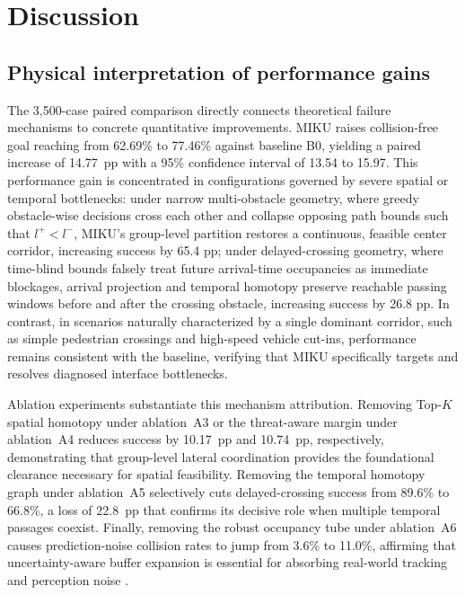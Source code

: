 \section{Discussion}
\label{sec:discussion}

\subsection{Physical interpretation of performance gains}

The 3,500-case paired comparison directly connects theoretical failure mechanisms to concrete quantitative improvements. MIKU raises collision-free goal reaching from 62.69\% to 77.46\% against baseline B0, yielding a paired increase of 14.77~pp with a 95\% confidence interval of 13.54 to 15.97. This performance gain is concentrated in configurations governed by severe spatial or temporal bottlenecks:
under narrow multi-obstacle geometry, where greedy obstacle-wise decisions cross each other and collapse opposing path bounds such that $l^+ < l^-$, MIKU's group-level partition restores a continuous, feasible center corridor, increasing success by 65.4 pp;
under delayed-crossing geometry, where time-blind bounds falsely treat future arrival-time occupancies as immediate blockages, arrival projection and temporal homotopy preserve reachable passing windows before and after the crossing obstacle, increasing success by 26.8 pp.
In contrast, in scenarios naturally characterized by a single dominant corridor, such as simple pedestrian crossings and high-speed vehicle cut-ins, performance remains consistent with the baseline, verifying that MIKU specifically targets and resolves diagnosed interface bottlenecks.

Ablation experiments substantiate this mechanism attribution. Removing Top-$K$ spatial homotopy under ablation~A3 or the threat-aware margin under ablation~A4 reduces success by 10.17~pp and 10.74~pp, respectively, demonstrating that group-level lateral coordination provides the foundational clearance necessary for spatial feasibility. Removing the temporal homotopy graph under ablation~A5 selectively cuts delayed-crossing success from 89.6\% to 66.8\%, a loss of 22.8~pp that confirms its decisive role when multiple temporal passages coexist. Finally, removing the robust occupancy tube under ablation~A6 causes prediction-noise collision rates to jump from 3.6\% to 11.0\%, affirming that uncertainty-aware buffer expansion is essential for absorbing real-world tracking and perception noise \citep{yoon2024stcorridor,yangbo2023ped,pathspeedstructured2024}.

